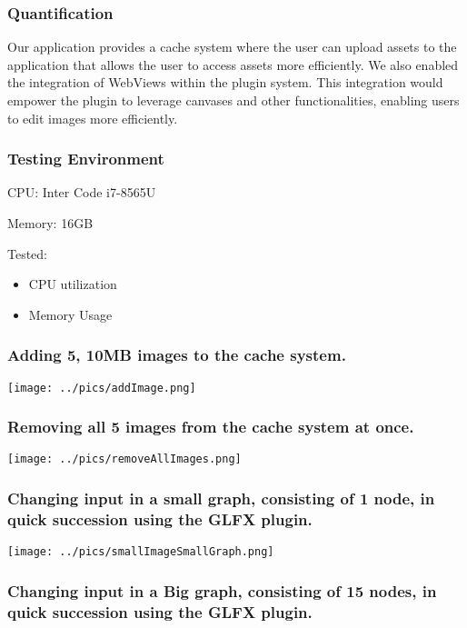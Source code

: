 \documentclass[11pt,a4paper]{article}
\begin{document}
\subsubsection*{Quantification}

Our application provides a cache system where the user can upload assets to the application that allows the user to access assets more efficiently. We also enabled the integration of WebViews within the plugin system. This integration would empower the plugin to leverage canvases and other functionalities, enabling users to edit images more efficiently. 

\subsubsection*{Testing Environment}
CPU: Inter Code i7-8565U

Memory: 16GB

Tested: 
\begin{itemize}
    \item CPU utilization
    \item Memory Usage
\end{itemize}

\subsubsection*{Adding 5, 10MB images to the cache system.}

\texttt{[image: ../pics/addImage.png]}

\newpage

\subsubsection*{Removing all 5 images from the cache system at once.}

\texttt{[image: ../pics/removeAllImages.png]}

\subsubsection*{Changing input in a small graph, consisting of 1 node, in quick succession using the GLFX plugin.}

\texttt{[image: ../pics/smallImageSmallGraph.png]}

\newpage

\subsubsection*{Changing input in a Big graph, consisting of 15 nodes, in quick succession using the GLFX plugin.}
\end{document}
